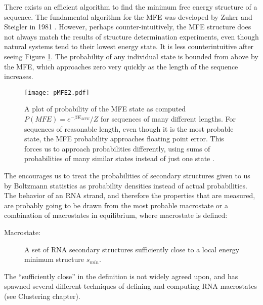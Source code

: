 There exists an efficient algorithm to find the minimum free energy
structure of a sequence. The fundamental algorithm for the MFE was
developed by Zuker and Steigler in 1981
\cite{zuker1981optimal}. However, perhaps counter-intuitively, the MFE
structure does not always match the results of structure determination
experiments, even though natural systems tend to their lowest energy
state. It is less counterintuitive after seeing Figure
\ref{fig:probMFE}. The probability of any individual state is bounded
from above by the MFE, which approaches zero very quickly as the
length of the sequence increases.
\begin{figure}[t]
\centering
\texttt{[image: pMFE2.pdf]}
\caption[MFE Probability]{A plot of probability of the MFE state as computed $P(MFE) =
  e^{-\beta E_{MFE}}/Z$ for sequences of many different lengths. For
  sequences of reasonable length, even though it is the most probable
  state, the MFE probability approaches floating point error. This
  forces us to approach probabilities differently, using sums of
  probabilities of many similar states instead of just one state
  \cite{aalbertsCommunication}.}
\label{fig:probMFE}
\end{figure}
The encourages us to treat the probabilities of secondary structures
given to us by Boltzmann statistics as probability densities instead
of actual probabilities. The behavior of an RNA strand, and therefore
the properties that are measured, are probably going to be drawn from
the most probable macrostate or a combination of macrostates in
equilibrium, where macrostate is defined:
\begin{description}
\item[Macrostate:] A set of RNA secondary structures sufficiently
  close to a local energy minimum structure $s_{min}$. 
\end{description}
The ``sufficiently close'' in the definition is not widely agreed
upon, and has spawned several different techniques of defining and
computing RNA macrostates (see Clustering chapter).

